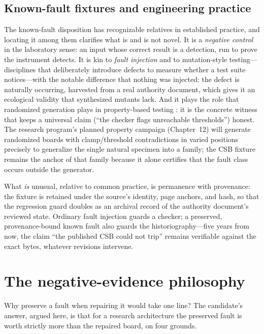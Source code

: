 \subsection{Known-fault fixtures and engineering practice}\label{ch11:fixture-practice}

The known-fault disposition has recognizable relatives in established practice, and locating it among them clarifies what is and is not novel. It is a \emph{negative control} in the laboratory sense: an input whose correct result is a detection, run to prove the instrument detects. It is kin to \emph{fault injection} and to mutation-style testing---disciplines that deliberately introduce defects to measure whether a test suite notices---with the notable difference that nothing was injected: the defect is naturally occurring, harvested from a real authority document, which gives it an ecological validity that synthesized mutants lack. And it plays the role that randomized generation plays in property-based testing \cite{quickcheck}: it is the concrete witness that keeps a universal claim (``the checker flags unreachable thresholds'') honest. The research program's planned property campaign (Chapter~12) will generate randomized boards with clamp/threshold contradictions in varied positions precisely to generalize the single natural specimen into a family; the CSB fixture remains the anchor of that family because it alone certifies that the fault class occurs outside the generator.

What \emph{is} unusual, relative to common practice, is permanence with provenance: the fixture is retained under the source's identity, page anchors, and hash, so that the regression guard doubles as an archival record of the authority document's reviewed state. Ordinary fault injection guards a checker; a preserved, provenance-bound known fault also guards the historiography---five years from now, the claim ``the published CSB could not trip'' remains verifiable against the exact bytes, whatever revisions intervene.

\section{The negative-evidence philosophy}\label{ch11:philosophy}

Why preserve a fault when repairing it would take one line? The candidate's answer, argued here, is that for a research architecture the preserved fault is worth strictly more than the repaired board, on four grounds.

